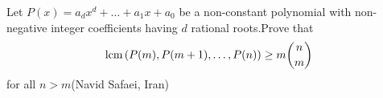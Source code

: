 Let $P(x)=a_d x^d+\dots+a_1 x+a_0$ be a non-constant polynomial with non-negative integer coefficients having $d$ rational roots.Prove that $$\text{lcm} \left(P(m),P(m+1),\dots,P(n) \right)\geq m \dbinom{n}{m}$$for all $n>m$(Navid Safaei, Iran)